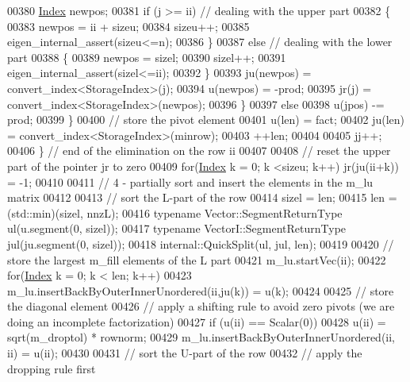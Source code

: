 \begin{DoxyCode}
00380           \hyperlink{namespace_eigen_a62e77e0933482dafde8fe197d9a2cfde}{Index} newpos;
00381           \textcolor{keywordflow}{if} (j >= ii) \textcolor{comment}{// dealing with the upper part}
00382           \{
00383             newpos = ii + sizeu;
00384             sizeu++;
00385             eigen\_internal\_assert(sizeu<=n);
00386           \}
00387           \textcolor{keywordflow}{else} \textcolor{comment}{// dealing with the lower part}
00388           \{
00389             newpos = sizel;
00390             sizel++;
00391             eigen\_internal\_assert(sizel<=ii);
00392           \}
00393           ju(newpos) = convert\_index<StorageIndex>(j);
00394           u(newpos) = -prod;
00395           jr(j) = convert\_index<StorageIndex>(newpos);
00396         \}
00397         \textcolor{keywordflow}{else}
00398           u(jpos) -= prod;
00399       \}
00400       \textcolor{comment}{// store the pivot element}
00401       u(len)  = fact;
00402       ju(len) = convert\_index<StorageIndex>(minrow);
00403       ++len;
00404 
00405       jj++;
00406     \} \textcolor{comment}{// end of the elimination on the row ii}
00407 
00408     \textcolor{comment}{// reset the upper part of the pointer jr to zero}
00409     \textcolor{keywordflow}{for}(\hyperlink{namespace_eigen_a62e77e0933482dafde8fe197d9a2cfde}{Index} k = 0; k <sizeu; k++) jr(ju(ii+k)) = -1;
00410 
00411     \textcolor{comment}{// 4 - partially sort and insert the elements in the m\_lu matrix}
00412 
00413     \textcolor{comment}{// sort the L-part of the row}
00414     sizel = len;
00415     len = (std::min)(sizel, nnzL);
00416     \textcolor{keyword}{typename} Vector::SegmentReturnType ul(u.segment(0, sizel));
00417     \textcolor{keyword}{typename} VectorI::SegmentReturnType jul(ju.segment(0, sizel));
00418     internal::QuickSplit(ul, jul, len);
00419 
00420     \textcolor{comment}{// store the largest m\_fill elements of the L part}
00421     m\_lu.startVec(ii);
00422     \textcolor{keywordflow}{for}(\hyperlink{namespace_eigen_a62e77e0933482dafde8fe197d9a2cfde}{Index} k = 0; k < len; k++)
00423       m\_lu.insertBackByOuterInnerUnordered(ii,ju(k)) = u(k);
00424 
00425     \textcolor{comment}{// store the diagonal element}
00426     \textcolor{comment}{// apply a shifting rule to avoid zero pivots (we are doing an incomplete factorization)}
00427     \textcolor{keywordflow}{if} (u(ii) == Scalar(0))
00428       u(ii) = sqrt(m\_droptol) * rownorm;
00429     m\_lu.insertBackByOuterInnerUnordered(ii, ii) = u(ii);
00430 
00431     \textcolor{comment}{// sort the U-part of the row}
00432     \textcolor{comment}{// apply the dropping rule first}

\end{DoxyCode}
